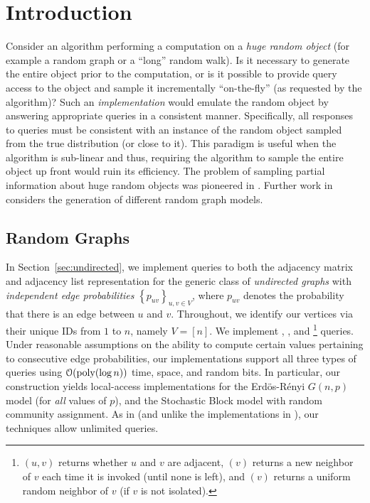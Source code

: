 \section{Introduction}
Consider an algorithm performing a computation on a \emph{huge random object} (for example a random graph or a ``long'' random walk).
Is it necessary to generate the entire object prior to the computation,
or is it possible to provide query access to the object and sample it incrementally ``on-the-fly'' (as requested by the algorithm)?
Such an \emph{implementation} would emulate the random object by answering appropriate queries in a consistent manner.
Specifically, all responses to queries must be consistent with an instance of the random object sampled from the true distribution (or close to it).
This paradigm is useful when the algorithm is sub-linear and thus,
requiring the algorithm to sample the entire object up front would ruin its efficiency.
The problem of sampling partial information about huge random objects was pioneered in \cite{huge_old,huge}.
Further work in \cite{sparse,reut} considers the generation of different random graph models.




\subsection{Random Graphs}%
\label{sec:random_graphs}
In Section~\ref{sec:undirected}, we implement queries to both the adjacency matrix and adjacency list representation
for the generic class of \emph{undirected graphs} with {\em independent edge probabilities} $\left\{ p_{uv} \right\}_{u,v\in V}$,
where $p_{uv}$ denotes the probability that there is an edge between $u$ and $v$.
Throughout, we identify our vertices via their unique IDs from $1$ to $n$, namely $V = [n]$.
We implement , , and 
\footnote{$(u,v)$ returns whether $u$ and $v$ are adjacent, $(v)$ returns a new neighbor of $v$ each time
it is invoked (until none is left), and $(v)$ returns a uniform random neighbor of $v$ (if $v$ is not isolated).} queries.
Under reasonable assumptions on the ability to compute certain values pertaining to consecutive edge probabilities,
our implementations support all three types of queries using $\mathcal{O}(\mathrm{poly}(\log n))$ time, space, and random bits.
In particular, our construction yields local-access implementations for the Erd\"{o}s-R\'{e}nyi $G(n,p)$ model (for \emph{all} values of $p$),
and the Stochastic Block model with random community assignment.
As in \cite{reut} (and unlike the implementations in \cite{huge_old,huge,sparse}), our techniques allow unlimited queries.


